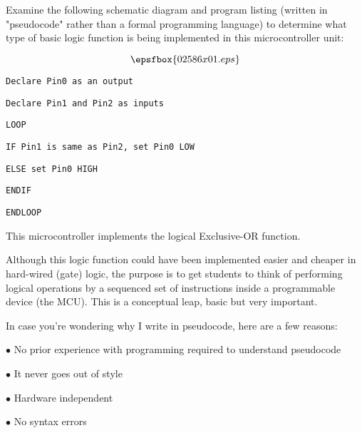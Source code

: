 

Examine the following schematic diagram and program listing (written in "pseudocode" rather than a formal programming language) to determine what type of basic logic function is being implemented in this microcontroller unit:

$$\epsfbox{02586x01.eps}$$

\noindent
{}

{\tt Declare Pin0 as an output}

{\tt Declare Pin1 and Pin2 as inputs}

{\tt LOOP}

\hskip 10pt {\tt IF Pin1 is same as Pin2, set Pin0 LOW}

\hskip 10pt {\tt ELSE set Pin0 HIGH}

\hskip 10pt {\tt ENDIF}

{\tt ENDLOOP}

\vskip 10pt







This microcontroller implements the logical Exclusive-OR function.







Although this logic function could have been implemented easier and cheaper in hard-wired (gate) logic, the purpose is to get students to think of performing logical operations by a sequenced set of instructions inside a programmable device (the MCU).  This is a conceptual leap, basic but very important.

\vskip 10pt

In case you're wondering why I write in pseudocode, here are a few reasons:

\medskip
\goodbreak
\item{$\bullet$} No prior experience with programming required to understand pseudocode
\item{$\bullet$} It never goes out of style
\item{$\bullet$} Hardware independent
\item{$\bullet$} No syntax errors
\medskip

